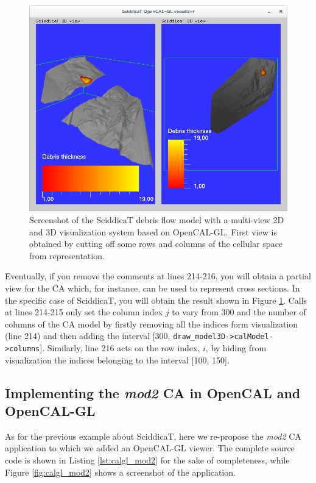 \begin{figure}
  \begin{center}
    \includegraphics[width=11.4cm]{./images/OpenCAL/calgl_sciddicaT3}
    \caption{Screenshot of the SciddicaT debris flow model with a
      multi-view 2D and 3D visualization system based on
      OpenCAL-GL. First view is obtained by cutting off some rows and
      columns of the cellular space from representation.}
    \label{fig:calgl_sciddicaT3}
  \end{center}
\end{figure}

Eventually, if you remove the comments at lines 214-216, you will
obtain a partial view for the CA which, for instance, can be used to
represent cross sections. In the specific case of SciddicaT, you will
obtain the result shown in Figure \ref{fig:calgl_sciddicaT3}. Calls at
lines 214-215 only set the column index $j$ to vary from 300 and the
number of columns of the CA model by firstly removing all the indices
form visualization (line 214) and then adding the interval [300,
  \verb'draw_model3D->calModel->columns']. Similarly, line 216 acts on
the row index, $i$, by hiding from visualization the indices
belonging to the interval [100, 150].

\subsection{Implementing the \emph{mod2} CA in OpenCAL and OpenCAL-GL}

As for the previous example about SciddicaT, here we re-propose the
\emph{mod2} CA application to which we added an OpenCAL-GL viewer. The
complete source code is shown in Listing \ref{lst:calgl_mod2} for the
sake of completeness, while Figure \ref{fig:calgl_mod2} shows a
screenshot of the application.

